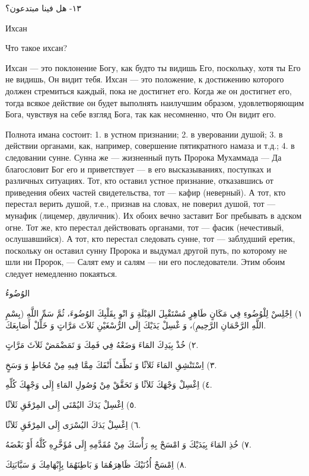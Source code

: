 \documentclass[a5paper]{article}
\begin{document}
١٣- هل فينا مبتدعون؟

Ихсан

Что такое ихсан?

Ихсан — это поклонение Богу, как будто ты видишь Его, поскольку, хотя ты Его не видишь, Он видит тебя. Ихсан — это положение, к достижению которого должен стремиться каждый, пока не достигнет его. Когда же он достигнет его, тогда всякое действие он будет выполнять наилучшим образом, удовлетворяющим Бога, чувствуя на себе взгляд Бога, так как несомненно, что Он видит его.

Полнота имана состоит: 1. в устном признании; 2. в уверовании душой; 3. в действии органами, как, например, совершение пятикрат­ного намаза и т.д.; 4. в следовании сунне. Сунна же — жизненный путь Пророка Мухаммада — Да благословит Бог его и привет­ствует — в его высказываниях, поступках и различных ситуациях. Тот, кто оставил устное признание, отказавшись от приведения обеих частей свидетельства, тот — кафир (неверный). А тот, кто перестал верить душой, т.е., признав на словах, не поверил душой, тот — мунафик (лицемер, двуличник). Их обоих вечно заставит Бог пребывать в адском огне. Тот же, кто перестал действовать органами, тот — фасик (нечестивый, ослушавшийся). А тот, кто перестал следовать сунне, тот — заблудший еретик, поскольку он оставил сунну Пророка и выдумал другой путь, по которому не шли ни Пророк, — Салят ему и салям — ни его последователи. Этим обоим следует немедленно покаяться.

الوُضُوءُ

١) اِجْلِسْ لِلْوُضُوءِ فِي مَكَانٍ طَاهِرٍ مُسْتَقْبِلَ القِبْلَةِ وَ انْوِ بِقَلْبِكَ الوُضُوءَ، ثُمَّ سَمِّ اللَّهِ (بِسْمِ اللَّهِ الرَّحْمَانِ الرَّحِيمِ)، وَ غْسِلْ يَدَيْكَ إِلَى الرُّسْغَيْنِ ثَلاَثَ مَرَّاتٍ وَ خَلِّلْ أَصَابِعَكَ.

٢) خُذْ بِيَدِكَ المَاءَ وَضَعْهُ فِي فَمِكَ وَ تَمَضْمَضْ ثَلاَثَ مَرَّاتٍ.

٣) اِسْتَنْشِقِ المَاءَ ثَلاَثًا وَ نَظِّفْ أَنْفَكَ مِمَّا فِيهِ مِنْ مُخَاطٍ وَ وَسَخٍ.

٤) اِغْسِلْ وَجْهَكَ ثَلاَثًا وَ تَحَقَّقْ مِنْ وُصُولِ المَاءِ إِلَى وَجْهِكَ كُلِّهِ. 

٥) اِغْسِلْ يَدَكَ اليُمْنَى إِلَى المِرْفَقِ ثَلاَثًا.

٦) اِغْسِلْ يَدَكَ اليُسْرَى إِلَى المِرْفَقِ ثَلاَثًا.

٧) خُذِ المَاءَ بِيَدَيْكَ وَ امْسَحْ بِهِ رَأْسَكَ مِنْ مُقَدَّمِهِ إِلَى مُؤَخَّرِهِ كُلَّهُ أَوْ بَعْضَهُ.

٨) اِمْسَحْ أُذُنَيْكَ ظَاهِرَهُمَا وَ بَاطِنَهُمَا بِإِبْهَامِكَ وَ سَبَّابَتِكَ.
\end{document}
